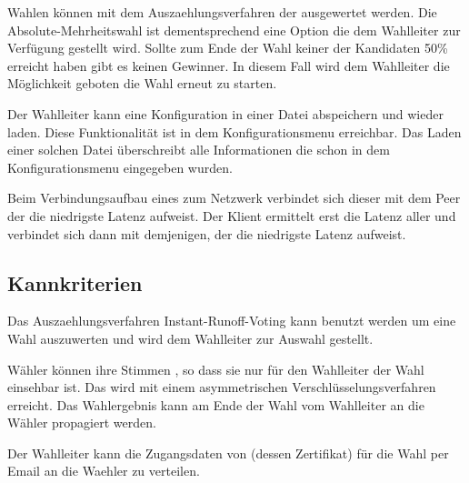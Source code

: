 \documentclass[parskip=full,11pt,twoside]{scrartcl}
\begin{document}
Wahlen können mit dem \gls{Auszaehlungsverfahren} der  ausgewertet werden. Die \gls{Absolute-Mehrheitswahl} ist dementsprechend eine Option die dem \gls{Wahlleiter} zur Verfügung gestellt wird.
Sollte zum Ende der Wahl keiner der Kandidaten 50\% erreicht haben gibt es keinen Gewinner.
In diesem Fall wird dem Wahlleiter die Möglichkeit geboten die Wahl erneut zu starten.

Der \gls{Wahlleiter} kann eine \gls{Konfiguration} in einer Datei abspeichern und wieder laden. Diese Funktionalität ist in dem \gls{Konfigurationsmenu} erreichbar. Das Laden einer solchen Datei überschreibt alle Informationen die schon in dem \gls{Konfigurationsmenu} eingegeben wurden.

Beim Verbindungsaufbau eines  zum \gls{Netzwerk} verbindet sich dieser mit dem \gls{Peer} der die niedrigste \gls{Latenz} aufweist. Der \gls{Klient} ermittelt erst die \gls{Latenz} aller  und verbindet sich dann mit demjenigen, der die niedrigste \gls{Latenz} aufweist.

\subsection{Kannkriterien}

Das \gls{Auszaehlungsverfahren} \gls{Instant-Runoff-Voting} kann benutzt werden um eine Wahl auszuwerten und wird dem \gls{Wahlleiter} zur Auswahl gestellt.

Wähler können ihre Stimmen , so dass sie nur für den \gls{Wahlleiter} der Wahl einsehbar ist.
Das wird mit einem asymmetrischen Verschlüsselungsverfahren erreicht.
Das Wahlergebnis kann am Ende der Wahl vom Wahlleiter an die Wähler propagiert werden.

Der \gls{Wahlleiter} kann die Zugangsdaten von  (dessen \gls{Zertifikat}) für die \gls{Wahl} per Email an die \gls{Waehler} zu verteilen.
\end{document}
